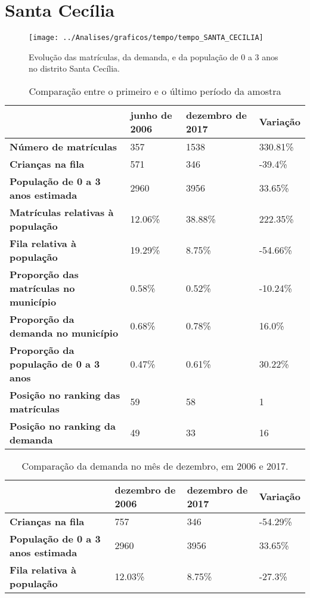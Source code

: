 \section{Santa Cecília}
\begin{figure}[H]
\centering
\texttt{[image: ../Analises/graficos/tempo/tempo\_SANTA\_CECILIA]}
\caption{Evolução das matrículas, da demanda, e da população de 0 a 3 anos no distrito Santa Cecília.}
\end{figure}
\begin{table}[H]
\begin{tabular}{|l|l|l|l|}
\hline
\textbf{}                                      & \textbf{junho de 2006}       & \textbf{dezembro de 2017}    & \textbf{Variação} \\ \hline
\textbf{Número de matrículas}                  & 357 & 1538 & 330.81\% \\ \hline
\textbf{Crianças na fila}                      & 571 & 346 & -39.4\% \\ \hline
\textbf{População de 0 a 3 anos estimada}      & 2960 & 3956 & 33.65\% \\ \hline
\textbf{Matrículas relativas à população}      & 12.06\% & 38.88\% & 222.35\% \\ \hline
\textbf{Fila relativa à população}             & 19.29\% & 8.75\% & -54.66\% \\ \hline
\textbf{Proporção das matrículas no município} & 0.58\% & 0.52\% & -10.24\% \\ \hline
\textbf{Proporção da demanda no município}     & 0.68\% & 0.78\% & 16.0\% \\ \hline
\textbf{Proporção da população de 0 a 3 anos}  & 0.47\% & 0.61\% & 30.22\% \\ \hline
\textbf{Posição no ranking das matrículas}     & 59 & 58 & 1 \\ \hline
\textbf{Posição no ranking da demanda}         & 49 & 33 & 16 \\ \hline
\end{tabular}
\caption{Comparação entre o primeiro e o último período da amostra}
\end{table}
\begin{table}[H]
\begin{tabular}{|l|l|l|l|}
\hline
\textbf{}                                 & \textbf{dezembro de 2006} & \textbf{dezembro de 2017} & \textbf{Variação} \\ \hline
\textbf{Crianças na fila}                      & 757 & 346 & -54.29\% \\ \hline
\textbf{População de 0 a 3 anos estimada}      & 2960 & 3956 & 33.65\% \\ \hline
\textbf{Fila relativa à população}             & 12.03\% & 8.75\% & -27.3\% \\ \hline
\end{tabular}
\caption{Comparação da demanda no mês de dezembro, em 2006 e 2017.}
\end{table}
